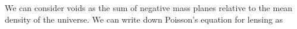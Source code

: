 We can consider voids as the sum of negative mass planes relative to the mean density of the universe. We can write down Poisson's equation for lensing as